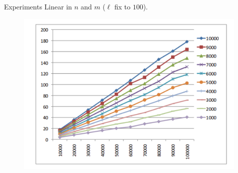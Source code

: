 \documentclass[first=dgreen,second=purple,logo=redque]{aaltoslides}
\begin{document}
\begin{frame}[allowframebreaks=1]{Experiments}
\framebreak
Linear in $n$ and $m$ ($\ell$ fix to $100$).
\begin{figure}
  \includegraphics[scale=0.6]{plots/time2}
\end{figure}
\end{frame}
\end{document}
